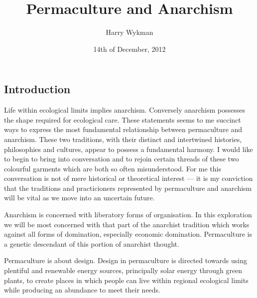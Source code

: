 \documentclass[a4paper, 11pt]{article}
\begin{document}
\title{Permaculture and Anarchism}
\author{Harry Wykman}
\date{14th of December, 2012}
\maketitle
\begin{multicols*}{2}

\section*{Introduction}
Life within ecological limits implies anarchism. Conversely anarchism possesses the shape required for ecological care.  These statements seems to me succinct ways to express the most fundamental relationship between permaculture and anarchism. These two traditions, with their distinct and intertwined histories, philosophies and cultures, appear to possess a fundamental harmony.  I would like to begin to bring into conversation and to rejoin certain threads of these two colourful garments which are both so often misunderstood.  For me this conversation is not of mere historical or theoretical interest --- it is my conviction that the traditions and practicioners represented by permaculture and anarchism will be vital as we move into an uncertain future.

Anarchism is concerned with liberatory forms of organisation. In this exploration we will be most concerned with that part of the anarchist tradition which works against all forms of domination, especially economic domination. Permaculture is a genetic descendant of this portion of anarchist thought.

Permaculture is about design.  Design in permaculture is directed towards using plentiful and renewable energy sources, principally solar energy through green plants, to create places in which people can live within regional ecological limits while producing an abundance to meet their needs.


\end{multicols*}
\end{document}
